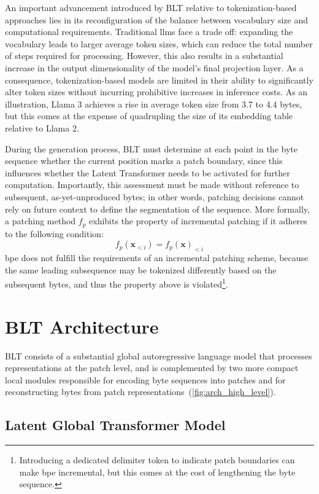 An important advancement introduced by {\textsc BLT} relative to tokenization-based approaches lies in its reconfiguration of the balance between vocabulary size and computational requirements. Traditional llms face a trade off: expanding the vocabulary leads to larger average token sizes, which can reduce the total number of steps required for processing. However, this also results in a substantial increase in the output dimensionality of the model's final projection layer. As a consequence, tokenization-based models are limited in their ability to significantly alter token sizes without incurring prohibitive increases in inference costs. As an illustration, Llama 3 achieves a rise in average token size from 3.7 to 4.4 bytes, but this comes at the expense of quadrupling the size of its embedding table relative to Llama 2.

During the generation process, {\textsc BLT} must determine at each point in the byte sequence whether the current position marks a patch boundary, since this influences whether the Latent Transformer needs to be activated for further computation. Importantly, this assessment must be made without reference to subsequent, as-yet-unproduced bytes; in other words, patching decisions cannot rely on future context to define the segmentation of the sequence. More formally, a patching method $f_p$ exhibits the property of incremental patching if it adheres to the following condition:
$$f_p(\pmb{x}_{<i}) = f_p(\pmb{x})_{<i}$$
bpe does not fulfill the requirements of an incremental patching scheme, because the same leading subsequence may be tokenized differently based on the subsequent bytes, and thus the property above is violated\footnote{Introducing a dedicated delimiter token to indicate patch boundaries can make bpe incremental, but this comes at the cost of lengthening the byte sequence.}.

\section{{\textsc BLT} Architecture}
\label{section:architecture}
{\textsc BLT} consists of a substantial global autoregressive language model that processes representations at the patch level, and is complemented by two more compact local modules responsible for encoding byte sequences into patches and for reconstructing bytes from patch representations~(\autoref{fig:arch_high_level}).

\subsection{Latent Global Transformer Model}

